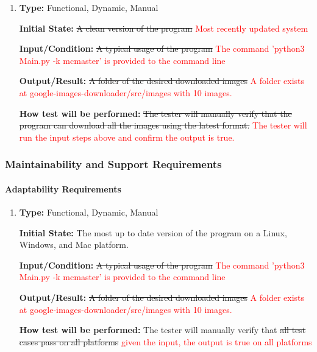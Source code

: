 \documentclass[12pt, titlepage]{article}
\begin{document}
\begin{enumerate}[label=NFR-IAR\arabic*:, wide=0pt, leftmargin=*]

\item \phantom{empty}

\textbf{Type:} Functional, Dynamic, Manual
					
\textbf{Initial State:} \sout{A clean version of the program} \textcolor{red}{Most recently updated system}
					
\textbf{Input/Condition:} \sout{A typical usage of the program}
\textcolor{red}{The command 'python3 Main.py -k mcmaster' is provided to the command line}
					
\textbf{Output/Result:} \sout{A folder of the desired downloaded images}
\textcolor{red}{A folder exists at google-images-downloader/src/images with 10 images.}
					
\textbf{How test will be performed:} \sout{The tester will manually verify that the program can download 
all the images using the latest format.}
\textcolor{red}{The tester will run the input steps above and confirm the output is true.}

\end{enumerate}

\subsubsection{Maintainability and Support Requirements}
		
\paragraph{Adaptability Requirements}

\begin{enumerate}[label=NFR-ADR\arabic*:, wide=0pt, leftmargin=*]

\item \phantom{empty}

\textbf{Type:} Functional, Dynamic, Manual
					
\textbf{Initial State:} The most up to date version of the program on a Linux, Windows, and Mac platform.
					
\textbf{Input/Condition:} \sout{A typical usage of the program}
\textcolor{red}{The command 'python3 Main.py -k mcmaster' is provided to the command line}
					
\textbf{Output/Result:} \sout{A folder of the desired downloaded images}
\textcolor{red}{A folder exists at google-images-downloader/src/images with 10 images.}
					
\textbf{How test will be performed:} The tester will manually verify that \sout{all test cases pass on all platforms} 
\textcolor{red}{given the input, the output is true on all platforms}

\end{enumerate}
\end{document}
